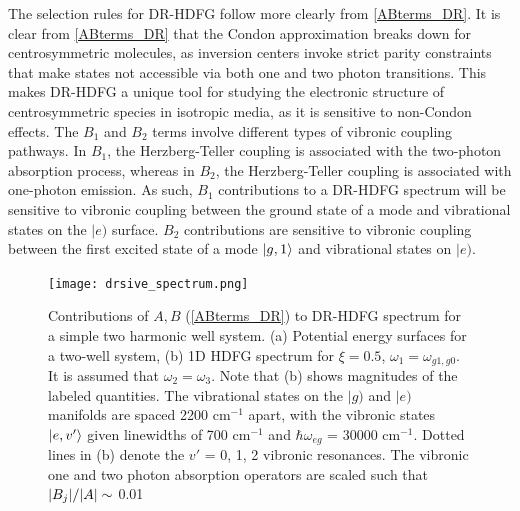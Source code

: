 \documentclass[aip, jcp, reprint, onecolumn]{revtex4-2}
\begin{document}
The selection rules for DR-HDFG follow more clearly from \autoref{ABterms_DR}.
It is clear from \autoref{ABterms_DR} that the Condon approximation breaks down for centrosymmetric molecules, as inversion centers invoke strict parity constraints that make states not accessible via both one and two photon transitions. \cite{Milojevich2013, RN230}
This makes DR-HDFG a unique tool for studying the electronic structure of centrosymmetric species in isotropic media, as it is sensitive to non-Condon effects. \cite{Olson2018}
The $B_1$ and $B_2$ terms involve different types of vibronic coupling pathways.
In $B_1$, the Herzberg-Teller coupling is associated with the two-photon absorption process, whereas in $B_2$, the Herzberg-Teller coupling is associated with one-photon emission.
As such, $B_1$ contributions to a DR-HDFG spectrum will be sensitive to vibronic coupling between the ground state of a mode and vibrational states on the $|e)$ surface. 
$B_2$ contributions are sensitive to vibronic coupling between the first excited state of a mode $\ket{g,1}$ and vibrational states on $|e)$.

\begin{figure}[!htbp]
	\centering
	\texttt{[image: drsive\_spectrum.png]}
	\caption{Contributions of $A, B$ (\autoref{ABterms_DR}) to DR-HDFG spectrum for a simple two harmonic well system.
		(a) Potential energy surfaces for a two-well system, (b) 1D HDFG spectrum for $\xi = 0.5$, $\omega_1 = \omega_{g1, g0}$. 
		It is assumed that $\omega_2 = \omega_3$.
		Note that (b) shows magnitudes of the labeled quantities.
		The vibrational states on the $|g)$ and $|e)$ manifolds are spaced 2200 cm$^{-1}$ apart, with the vibronic states $\ket{e,v'}$ given linewidths of 700 cm$^{-1}$ and $\hbar \omega_{eg}$ = 30000 cm$^{-1}$.
		Dotted lines in (b) denote the $v'$ = 0, 1, 2 vibronic resonances. 
		The vibronic one and two photon absorption operators are scaled such that $\abs{B_j}/\abs{A} \sim$ 0.01}
	\label{fig:doubres_spec}
\end{figure}
\end{document}
